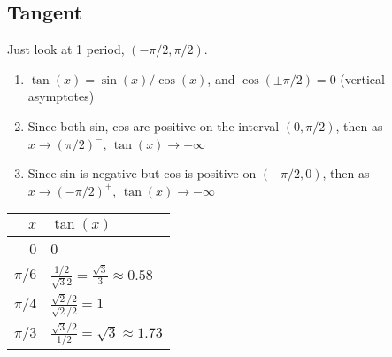 \documentclass{tufte-handout}
\begin{document}
\subsection{Tangent}
Just look at 1 period, $(-\pi/2, \pi/2)$.
\begin{enumerate}
\item $\tan(x) = \sin(x)/\cos(x)$, and $\cos(\pm\pi/2) = 0$ (vertical asymptotes)
\item Since both sin, cos are positive on the interval $(0, \pi/2)$, then as $x \to (\pi/2)^-$, $\tan(x) \to +\infty$
\item Since sin is negative but cos is positive on $(-\pi/2, 0)$, then as $x\to(-\pi/2)^+$, $\tan(x) \to -\infty$
\end{enumerate}
\begin{minipage}{0.4\textwidth}
\begin{tabular}{r|l}
$x$ & $\tan(x)$ \\ \hline
0 & 0 \\
$\pi/6$ & $\frac{1/2}{\sqrt{3}{2}} = \frac{\sqrt{3}}{3} \approx 0.58$ \\
$\pi/4$ & $\frac{\sqrt{2}/2}{\sqrt{2}/2} = 1$ \\
$\pi/3$ & $\frac{\sqrt{3}/2}{1/2} = \sqrt{3} \approx 1.73$
\end{tabular}
\end{minipage}
\begin{minipage}{0.5\textwidth}
\end{minipage}
\end{document}
